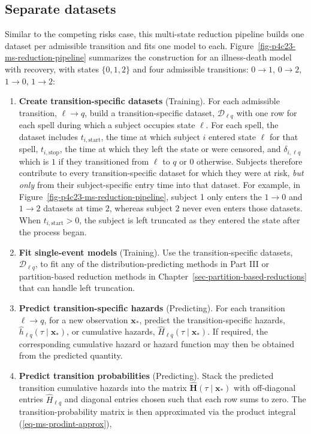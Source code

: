 \documentclass[
  letterpaper,
  krantz2]{style/krantz}
\begin{document}
\subsection{Separate datasets}\label{sec-ms-transition-datasets}

Similar to the competing risks case, this multi-state reduction pipeline
builds one dataset per admissible transition and fits one model to each.
Figure~\ref{fig-p4c23-ms-reduction-pipeline} summarizes the construction
for an illness-death model with recovery, with states \(\{0, 1, 2\}\)
and four admissible transitions: \(0\to1\), \(0\to2\), \(1\to0\),
\(1\to2\):

\begin{enumerate}
\def\labelenumi{\arabic{enumi}.}
\item
  \textbf{Create transition-specific datasets} (Training). For each
  admissible transition, \(\ell \to q\), build a transition-specific
  dataset, \(\mathcal{D}_{\ell q}\) with one row for each spell during
  which a subject occupies state \(\ell\). For each spell, the dataset
  includes \(t_{i,\text{start}}\), the time at which subject \(i\)
  entered state \(\ell\) for that spell, \(t_{i,\text{stop}}\), the time
  at which they left the state or were censored, and
  \(\delta_{i,\ell q}\) which is \(1\) if they transitioned from
  \(\ell\) to \(q\) or \(0\) otherwise. Subjects therefore contribute to
  every transition-specific dataset for which they were at risk,
  \emph{but only} from their subject-specific entry time into that
  dataset. For example, in Figure~\ref{fig-p4c23-ms-reduction-pipeline},
  subject 1 only enters the \(1 \to 0\) and \(1 \to 2\) datasets at time
  \(2\), whereas subject \(2\) never even enters those datasets. When
  \(t_{i,\text{start}} > 0\), the subject is left truncated as they
  entered the state after the process began.
\item
  \textbf{Fit single-event models} (Training). Use the
  transition-specific datasets, \(\mathcal{D}_{\ell q}\), to fit any of
  the distribution-predicting methods in Part III or partition-based
  reduction methods in Chapter~\ref{sec-partition-based-reductions} that
  can handle left truncation.
\item
  \textbf{Predict transition-specific hazards} (Predicting). For each
  transition \(\ell \to q\), for a new observation \(\mathbf{x}_*\),
  predict the transition-specific hazards,
  \(\hat{h}_{\ell q}(\tau \mid \mathbf{x}_*)\), or cumulative hazards,
  \(\hat{H}_{\ell q}(\tau \mid \mathbf{x}_*)\). If required, the
  corresponding cumulative hazard or hazard function may then be
  obtained from the predicted
  quantity.
\item
  \textbf{Predict transition probabilities} (Predicting). Stack the
  predicted transition cumulative hazards into the matrix
  \(\hat{\mathbf{H}}(\tau \mid \mathbf{x}_*)\) with off-diagonal entries
  \(\hat{H}_{\ell q}\) and diagonal entries chosen such that each row
  sums to zero. The transition-probability
  matrix is then approximated via the
  product integral (\ref{eq-ms-prodint-approx}),


\end{enumerate}
\end{document}
